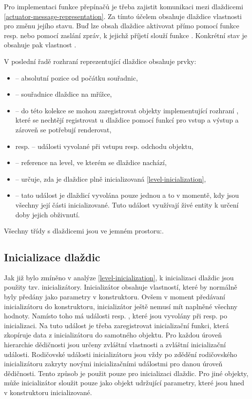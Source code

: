 
Pro implementaci funkce přepínačů je třeba zajistit komunikaci mezi dlaždicemi \vref{actuator-message-representation}.
Za tímto účelem obsahuje dlaždice vlastnosti pro změnu jejího stavu. Buď lze obsah dlaždice aktivovat přímo
pomocí funkce  resp.  nebo pomocí zaslání zpráv, k jejichž
příjetí slouží funkce . Konkrétní stav je obsahuje pak vlastnost .


V poslední řadě rozhraní reprezentující dlaždice obsahuje prvky: 
\begin{itemize}
\item {} -- absolutní pozice od počátku souřadnic,
\item {} -- souřadnice dlaždice na mřížce, 
\item {} -- do této kolekce se mohou zaregistrovat objekty implementující rozhraní , 
	které se nechtějí registrovat u dlaždice pomocí funkcí pro vstup a výstup a zároveň se potřebují renderovat, 
\item {} resp.  -- události vyvolané při vstupu resp. odchodu objektu,
\item {} -- reference na level, ve kterém se dlaždice nachází,
\item {} -- určuje, zda je dlaždice plně inicializovaná \vref{level-inicialization},
\item {} -- tato událost je dlaždicí vyvolána pouze jednou a to v momentě, kdy jsou všechny její části inicializované.
		Tuto událost využívají živé entity k určení doby jejich obživnutí.
\end{itemize}

Všechny třídy s dlaždicemi jsou ve jemném prostoru:\newline {}.

\subsection{Inicializace dlaždic}
Jak již bylo zmíněno v analýze \vref{level-inicialization}, k inicializaci dlaždic jsou použity tzv. inicializátory. Inicializátor
obsahuje vlastností, které by normálně byly předány jako parametry v konstruktoru. Ovšem v moment předávaní
inicializátoru do konstruktoru, inicializátor ještě nemusí mít naplněné všechny hodnoty. Namísto toho má události 
resp. , které jsou vyvolány při resp. po inicializaci. Na tuto událost je třeba zaregistrovat
inicializační funkci, která zkopíruje data z inicializátoru do samotného objektu. Pro každou úroveň hierarchie
dědičnosti jsou určeny zvláštní vlastnosti a zvláštní inicializační události. Rodičovské události  inicializátoru jsou vždy
po zdědění rodičovského inicializátoru zakryty novými inicializačními událostmi pro danou úroveň dědičnosti.
Tento způsob je použit pouze pro inicializaci dlaždic. Pro jiné objekty, může inicializátor sloužit pouze jako 
objekt udržující parametry, které jsou hned v konstruktoru inicializované. 

